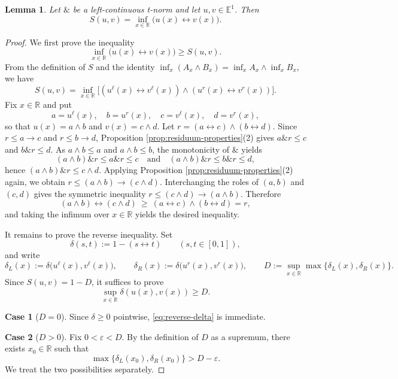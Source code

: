 \documentclass[preprint,3p,times]{elsarticle}
\theoremstyle{plain}
\newtheorem{lem}[thm]{Lemma}
\theoremstyle{definition}
\numberwithin{equation}{section}
\begin{document}
\begin{lem}\label{pointwise representation}
Let $\&$ be a left-continuous t-norm  and let $u,v\in\mathbb{E}^1$. Then
\[
S(u,v)=\inf_{x\in\mathbb{R}}\bigl(u(x)\leftrightarrow v(x)\bigr).
\]
\end{lem}

\begin{proof}
We first prove the inequality
\[
\inf_{x\in\mathbb{R}}\bigl(u(x)\leftrightarrow v(x)\bigr)\ge S(u,v).
\]
From the definition of $S$ and the identity
$\inf_x(A_x\wedge B_x)=\inf_x A_x\wedge\inf_x B_x$, we have
\[
S(u,v)=\inf_{x\in\mathbb{R}}
\bigl[(u^\ell(x)\leftrightarrow v^\ell(x))\wedge
(u^r(x)\leftrightarrow v^r(x))\bigr].
\]
Fix $x\in\mathbb{R}$ and put
\[
a=u^\ell(x),\quad b=u^r(x),\quad c=v^\ell(x),\quad d=v^r(x),
\]
so that $u(x)=a\wedge b$ and $v(x)=c\wedge d$. Let
$r=(a\leftrightarrow c)\wedge(b\leftrightarrow d)$. Since $r\le a\to c$
and $r\le b\to d$, Proposition
\ref{prop:residuum-properties}(2) gives
$a\mathbin{\&}r\le c$ and $b\mathbin{\&}r\le d$. As $a\wedge b\le a$
and $a\wedge b\le b$, the monotonicity of $\&$ yields
\[
(a\wedge b)\mathbin{\&}r\le a\mathbin{\&}r\le c
\quad\text{and}\quad
(a\wedge b)\mathbin{\&}r\le b\mathbin{\&}r\le d,
\]
hence $(a\wedge b)\mathbin{\&}r\le c\wedge d$. Applying Proposition
\ref{prop:residuum-properties}(2) again,
we obtain $r\le(a\wedge b)\to(c\wedge d)$. Interchanging the roles of
$(a,b)$ and $(c,d)$ gives the symmetric inequality
$r\le(c\wedge d)\to(a\wedge b)$. Therefore
\[
(a\wedge b)\leftrightarrow(c\wedge d)
\ \ge\ (a\leftrightarrow c)\wedge(b\leftrightarrow d)=r,
\]
and taking the infimum over $x\in\mathbb{R}$ yields the desired
inequality.


It remains to prove the reverse inequality. Set
\[
\delta(s,t):=1-(s\leftrightarrow t)\qquad (s,t\in[0,1]),
\]
and write
\[
\delta_L(x):=\delta\bigl(u^\ell(x),v^\ell(x)\bigr),\qquad
\delta_R(x):=\delta\bigl(u^r(x),v^r(x)\bigr),\qquad
D:=\sup_{x\in\mathbb{R}}\max\bigl\{\delta_L(x),\delta_R(x)\bigr\}.
\]
Since $S(u,v)=1-D$, it suffices to prove
\begin{equation}\label{eq:reverse-delta}
\sup_{x\in\mathbb{R}}\delta(u(x),v(x))\ge D.
\end{equation}

\noindent\textbf{Case 1} ($D=0$). Since $\delta\ge0$ pointwise,
\eqref{eq:reverse-delta} is immediate.

\medskip
\noindent\textbf{Case 2} ($D>0$). Fix $0<\varepsilon<D$. By the
definition of $D$ as a supremum, there exists $x_0\in\mathbb{R}$ such
that
\[
\max\bigl\{\delta_L(x_0),\delta_R(x_0)\bigr\}>D-\varepsilon.
\]
We treat the two possibilities separately.


\end{proof}
\end{document}
